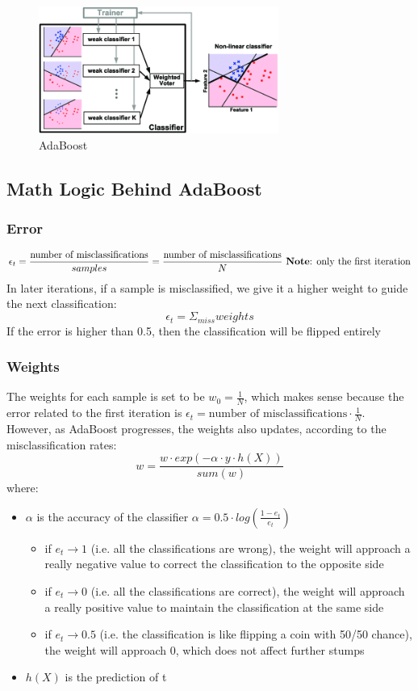 \documentclass[12pt]{article}
\begin{document}
\begin{figure}[htbp]
\begin{center}
\includegraphics[width = 0.7\textwidth]{Images/AdaBoost.png}
\caption{AdaBoost}
\label{default}
\end{center}
\end{figure}

\subsection{Math Logic Behind AdaBoost}
\subsubsection{Error}
$$\epsilon_t = \frac{\text{number of misclassifications}}{samples} = \frac{\text{number of misclassifications}}{N} \text{ \textbf{Note}: only the first iteration}$$
In later iterations, if a sample is misclassified, we give it a higher weight to guide the next classification:
$$\epsilon_t = \Sigma_{miss}weights$$
If the error is higher than 0.5, then the classification will be flipped entirely

\subsubsection{Weights}
The weights for each sample is set to be $w_0 = \frac{1}{N}$, which makes sense because the error related to the first iteration is $\epsilon_t = \text{number of misclassifications}\cdot \frac{1}{N}$. However, as AdaBoost progresses, the weights also updates, according to the misclassification rates:
$$w = \frac{w\cdot exp(-\alpha\cdot y\cdot h(X))}{sum(w)}$$
where:
\begin{itemize}
	\item $\alpha$ is the accuracy of the classifier $\alpha = 0.5\cdot log(\frac{1-e_t}{e_t})$
	\begin{itemize}
		\item if $e_t \rightarrow 1$ (i.e. all the classifications are wrong), the weight will approach a really negative value to correct the classification to the opposite side
		\item if $e_t \rightarrow 0$ (i.e. all the classifications are correct), the weight will approach a really positive value to maintain the classification at the same side
		\item if $e_t \rightarrow 0.5$ (i.e. the classification is like flipping a coin with 50/50 chance), the weight will approach 0, which does not affect further stumps
    	\end{itemize}
	\item $h(X)$ is the prediction of t
\end{itemize}
\end{document}
